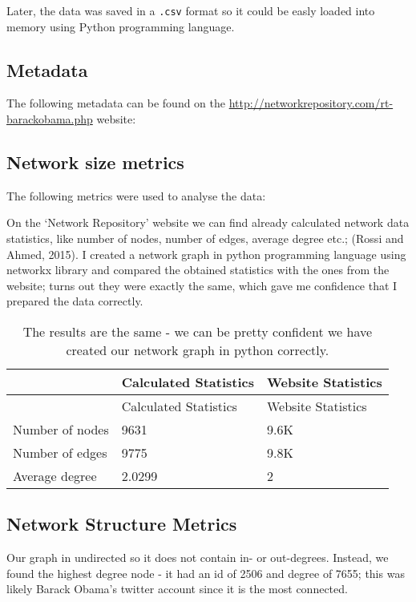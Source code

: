 \documentclass[
]{article}
\begin{document}
Later, the data was saved in a \texttt{.csv} format so it could be easly
loaded into memory using Python programming language.

\hypertarget{metadata}{%
\subsection{Metadata}\label{metadata}}

The following metadata can be found on the
\url{http://networkrepository.com/rt-barackobama.php} website:

\hypertarget{network-size-metrics}{%
\subsection{Network size metrics}\label{network-size-metrics}}

The following metrics were used to analyse the data:

On the `Network Repository' website we can find already calculated
network data statistics, like number of nodes, number of edges, average
degree etc.; (Rossi and Ahmed, 2015). I created a network graph in
python programming language using networkx library and compared the
obtained statistics with the ones from the website; turns out they were
exactly the same, which gave me confidence that I prepared the data
correctly.

\begin{longtable}[]{@{}lll@{}}
\caption{The results are the same - we can be pretty confident we have
created our network graph in python correctly.}\tabularnewline
\toprule
& Calculated Statistics & Website Statistics\tabularnewline
\midrule
\endfirsthead
\toprule
& Calculated Statistics & Website Statistics\tabularnewline
\midrule
\endhead
Number of nodes & 9631 & 9.6K\tabularnewline
Number of edges & 9775 & 9.8K\tabularnewline
Average degree & 2.0299 & 2\tabularnewline
\bottomrule
\end{longtable}

\hypertarget{network-structure-metrics}{%
\subsection{Network Structure Metrics}\label{network-structure-metrics}}

Our graph in undirected so it does not contain in- or out-degrees.
Instead, we found the highest degree node - it had an id of 2506 and
degree of 7655; this was likely Barack Obama's twitter account since it
is the most connected.
\end{document}
